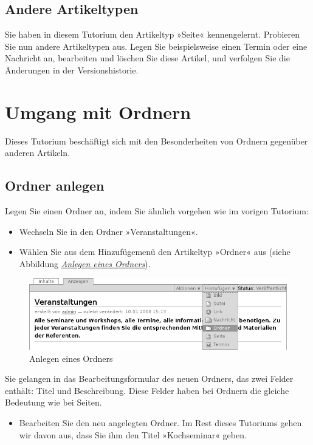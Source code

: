 \documentclass[a4paper,12pt,ngerman]{manual}
\begin{document}
\subsection{Andere Artikeltypen}

Sie haben in diesem Tutorium den Artikeltyp »Seite« kennengelernt. Probieren
Sie nun andere Artikeltypen aus. Legen Sie beispielsweise einen Termin oder
eine Nachricht an, bearbeiten und löschen Sie diese Artikel, und verfolgen Sie
die Änderungen in der Versionshistorie.

\resetcurrentobjects
\hypertarget{--doc-tutorien/umgang-ordner}{}

\section{Umgang mit Ordnern}

Dieses Tutorium beschäftigt sich mit den Besonderheiten von Ordnern
gegenüber anderen Artikeln.


\subsection{Ordner anlegen}

Legen Sie einen Ordner an, indem Sie ähnlich vorgehen wie im vorigen Tutorium:
\begin{itemize}
\item {} 
Wechseln Sie in den Ordner »Veranstaltungen«.

\item {} 
Wählen Sie aus dem Hinzufügemenü den Artikeltyp »Ordner« aus (siehe
Abbildung \hyperlink{fig-add-menu-ordner}{\emph{Anlegen eines Ordners}}).

\end{itemize}
\hypertarget{fig-add-menu-ordner}{}\begin{figure}[htbp]
\centering

\includegraphics{add-menu-ordner.png}
\caption{Anlegen eines Ordners}\end{figure}

Sie gelangen in das Bearbeitungsformular des neuen Ordners, das
zwei Felder enthält: Titel und Beschreibung.
Diese Felder haben bei Ordnern die gleiche Bedeutung wie bei Seiten.
\begin{itemize}
\item {} 
Bearbeiten Sie den neu angelegten Ordner. Im Rest dieses Tutoriums
gehen wir davon aus, dass Sie ihm den Titel »Kochseminar« geben.

\end{itemize}
\end{document}
